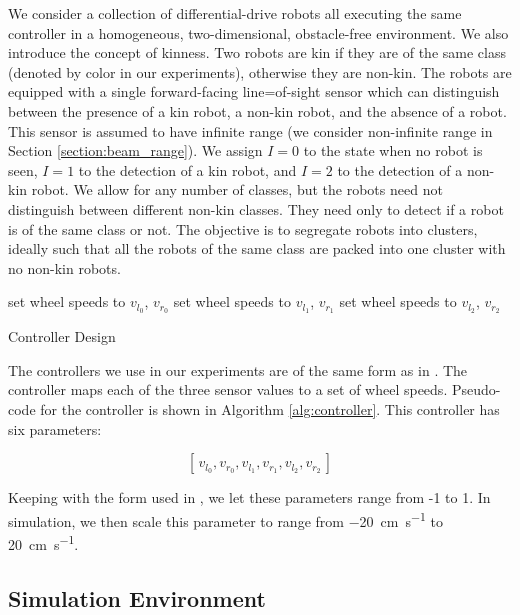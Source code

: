 \documentclass[conference]{IEEEtran}
\begin{document}
    We consider a collection of differential-drive robots all executing the same controller in a homogeneous, two-dimensional, obstacle-free environment. We also introduce the concept of kinness. Two robots are kin if they are of the same class (denoted by color in our experiments), otherwise they are non-kin. The robots are equipped with a single forward-facing line=of-sight sensor which can distinguish between the presence of a kin robot, a non-kin robot, and the absence of a robot. This sensor is assumed to have infinite range (we consider non-infinite range in Section \ref{section:beam_range}). We assign $I=0$ to the state when no robot is seen, $I=1$ to the detection of a kin robot, and $I=2$ to the detection of a non-kin robot. We allow for any number of classes, but the robots need not distinguish between different non-kin classes. They need only to detect if a robot is of the same class or not. The objective is to segregate robots into clusters, ideally such that all the robots of the same class are packed into one cluster with no non-kin robots.

    \begin{algorithm}[t!]
      \begin{algorithmic}
       \State set wheel speeds to $v_{l_0}$, $v_{r_0}$
       \State set wheel speeds to $v_{l_1}$, $v_{r_1}$
      \Else \State set wheel speeds to $v_{l_2}$, $v_{r_2}$
      \EndIf
      \end{algorithmic}
      \caption{Controller Design}
      \label{alg:controller}
    \end{algorithm}

    The controllers we use in our experiments are of the same form as in \cite{gauci_self-organized_2014}. The controller maps each of the three sensor values to a set of wheel speeds. Pseudo-code for the controller is shown in Algorithm \ref{alg:controller}. This controller has six parameters:

    $$[\,v_{l_0}, v_{r_0}, v_{l_1}, v_{r_1}, v_{l_2}, v_{r_2}\,]$$

    Keeping with the form used in \cite{gauci_self-organized_2014}, we let these parameters range from -1 to 1. In simulation, we then scale this parameter to range from \SI{-20}{\centi\meter\per\second} to \SI{20}{\centi\meter\per\second}.

  \subsection{Simulation Environment}
\end{document}
